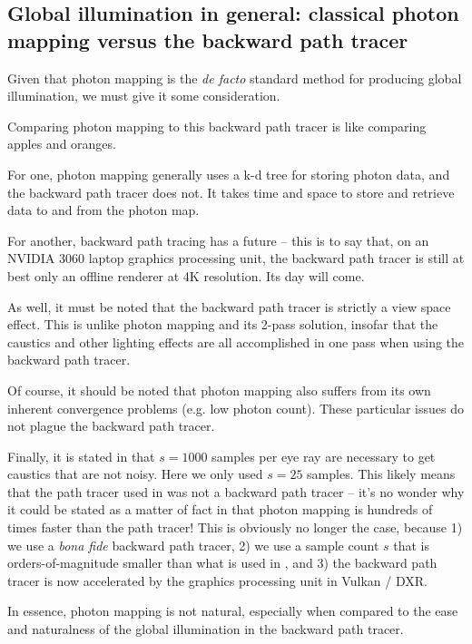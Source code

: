 \documentclass[12pt]{article}
\begin{document}
\begin{appendix}
\section{Global illumination in general: classical photon mapping versus the backward path tracer}

Given that photon mapping \cite{jensen, john} is the \textit{de facto} standard method for producing global illumination, we must give it some consideration.

Comparing photon mapping to this backward path tracer is like comparing apples and oranges.

For one, photon mapping generally uses a k-d tree for storing photon data, and the backward path tracer does not.
It takes time and space to store and retrieve data to and from the photon map.

For another, backward path tracing has a future -- this is to say that, on an NVIDIA 3060 laptop graphics processing unit, the backward path tracer is still at best only an offline renderer at 4K resolution.
Its day will come.

As well, it must be noted that the backward path tracer is strictly a view space effect.
This is unlike photon mapping and its 2-pass solution, insofar that the caustics and other lighting effects are all accomplished in one pass when using the backward path tracer.

Of course, it should be noted that photon mapping also suffers from its own inherent convergence problems (e.g. low photon count).
These particular issues do not plague the backward path tracer.

Finally, it is stated in \cite{jensen} that $s = 1000$ samples per eye ray are necessary to get caustics that are not noisy.
Here we only used $s = 25$ samples.
This likely means that the path tracer used in \cite{jensen} was not a backward path tracer -- it's no wonder why it could be stated as a matter of fact in \cite{jensen} that photon mapping is hundreds of times faster than the path tracer!
This is obviously no longer the case, because 1) we use a {\textit{bona fide}} backward path tracer, 2) we use a sample count $s$ that is orders-of-magnitude smaller than what is used in \cite{jensen}, and 3) the backward path tracer is now accelerated by the graphics processing unit in Vulkan / DXR.

In essence, photon mapping is not natural, especially when compared to the ease and naturalness of the global illumination in the backward path tracer.







\end{appendix}
\end{document}
